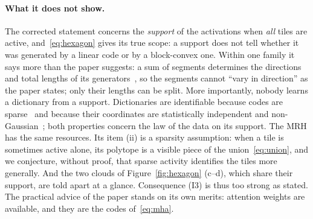 \documentclass[sigconf,nonacm,screen]{acmart}
\begin{document}
\paragraph{What it does not show.} The corrected statement concerns the \emph{support} of the activations
when \emph{all} tiles are active, and~\eqref{eq:hexagon} gives its true scope: a support does not tell
whether it was generated by a linear code or by a block-convex one. Within one family it says more than the
paper suggests: a sum of segments determines the directions and total lengths of its
generators~\cite{schneider2014convex}, so the segments cannot ``vary in direction'' as the paper states;
only their lengths can be split. More importantly, nobody learns a dictionary from a support. Dictionaries
are identifiable because codes are sparse~\cite{donoho2003optimally,aharon2006uniqueness} and because
their coordinates are statistically independent and non-Gaussian~\cite{comon1994independent}; both
properties concern the law of the data on its support. The MRH has the same resources. Its item (ii) is
a sparsity assumption: when a tile is sometimes active alone, its polytope is a visible piece of the
union~\eqref{eq:union}, and we conjecture, without proof, that sparse activity identifies the tiles more
generally. And the two clouds of Figure~\ref{fig:hexagon} (c--d), which share their support, are told apart
at a glance. Consequence (I3) is thus too strong as stated. The practical advice of the paper stands on its
own merits: attention weights are available, and they are the codes of~\eqref{eq:mha}.
\end{document}
